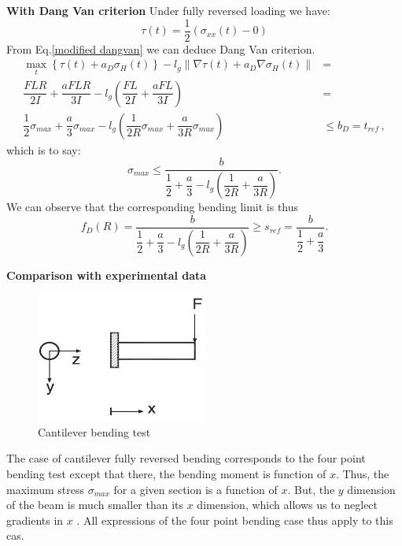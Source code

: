 \documentclass[3p,times,procedia,number]{elsarticle}
\begin{document}
\textbf{With Dang Van criterion}  
Under fully reversed loading we have:
$$\tau(t)=\dfrac{1}{2}(\sigma_{xx}(t)-0)$$ 
From Eq.\eqref{modified dangvan} we can deduce Dang Van criterion.
\begin{equation}
\begin{split}
\max \limits_{t}\left\{\tau{(t)}+a_D\sigma_H(t)\right\}-l_g\parallel{\nabla\tau{(t)}}+a_D\nabla\sigma_H(t)\parallel&=\\ \dfrac{FLR}{2I} +\dfrac{aFLR}{3I}-l_g\left( \dfrac{FL}{2I}+\dfrac{aFL}{3I}\right) &=\\ \dfrac{1}{2}\sigma_{max}+\dfrac{a}{3}\sigma_{max}-l_g\left( \dfrac{1}{2R}\sigma_{max}+\dfrac{a}{3R}\sigma_{max}\right) &\leqslant b_D= t_{ref}\, ,
\end{split}
\end{equation}
which is to say:
\begin{equation}
\sigma_{max}\leqslant\dfrac{b}{\dfrac{1}{2}+\dfrac{a}{3}-l_g\left( \dfrac{1}{2R}+\dfrac{a}{3R}\right) }.
\end{equation}
We can observe that the corresponding bending limit is thus
$$f_D(R)=\dfrac{b}{\dfrac{1}{2}+\dfrac{a}{3}-l_g\left( \dfrac{1}{2R}+\dfrac{a}{3R}\right) }\geqslant s_{ref} = \dfrac{b}{\dfrac{1}{2}+\dfrac{a}{3}}.
$$


\textbf{Comparison with experimental data}
\begin{figure}[!h]
	\begin{center}
		\includegraphics[width=0.5\textwidth]{figures//fig3.jpg} 
		\caption{Cantilever bending test \cite{papadopoulos1996invariant}}
		\label{fig9}
	\end{center}
\end{figure}
The case of cantilever fully reversed bending corresponds to the four point bending test except that there, the bending moment is function of $x$. Thus, the maximum stress $\sigma_{max}$ for a given section is a function of $x$. But, the $y$ dimension of the beam is much smaller than its $x$ dimension, which allows us to neglect gradients in $x$ . All  expressions of the four point bending case thus  apply to this cas. 
\end{document}
